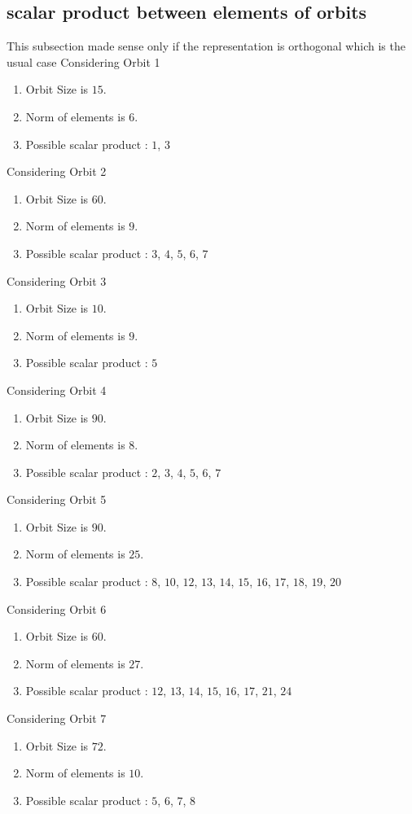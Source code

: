 \documentclass[12pt]{article}
\begin{document}
\subsection{scalar product between elements of orbits}
\noindent This subsection made sense only if the representation is orthogonal which is the usual case
Considering Orbit 1
\begin{enumerate}
\item Orbit Size is $15$.
\item Norm of elements is $6$.
\item Possible scalar product : $1$, $3$
\end{enumerate}
Considering Orbit 2
\begin{enumerate}
\item Orbit Size is $60$.
\item Norm of elements is $9$.
\item Possible scalar product : $3$, $4$, $5$, $6$, $7$
\end{enumerate}
Considering Orbit 3
\begin{enumerate}
\item Orbit Size is $10$.
\item Norm of elements is $9$.
\item Possible scalar product : $5$
\end{enumerate}
Considering Orbit 4
\begin{enumerate}
\item Orbit Size is $90$.
\item Norm of elements is $8$.
\item Possible scalar product : $2$, $3$, $4$, $5$, $6$, $7$
\end{enumerate}
Considering Orbit 5
\begin{enumerate}
\item Orbit Size is $90$.
\item Norm of elements is $25$.
\item Possible scalar product : $8$, $10$, $12$, $13$, $14$, $15$, $16$, $17$, $18$, $19$, $20$
\end{enumerate}
Considering Orbit 6
\begin{enumerate}
\item Orbit Size is $60$.
\item Norm of elements is $27$.
\item Possible scalar product : $12$, $13$, $14$, $15$, $16$, $17$, $21$, $24$
\end{enumerate}
Considering Orbit 7
\begin{enumerate}
\item Orbit Size is $72$.
\item Norm of elements is $10$.
\item Possible scalar product : $5$, $6$, $7$, $8$
\end{enumerate}
\end{document}

